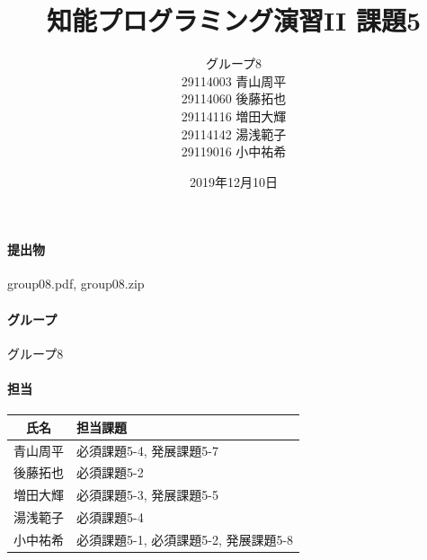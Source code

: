 \documentclass[uplatex,12pt]{jsarticle}
\title{知能プログラミング演習II 課題5}
\author{グループ8\\
  29114003 青山周平\\
  29114060 後藤拓也\\
  29114116 増田大輝\\
  29114142 湯浅範子\\
  29119016 小中祐希\\
}
\date{2019年12月10日}
\begin{document}
\maketitle

\paragraph{提出物} group08.pdf, group08.zip
\paragraph{グループ} グループ8

\paragraph{担当}
\begin{tabular}{|c|l|}
  \hline
  氏名&担当課題\\
  \hline\hline
  青山周平&必須課題5-4, 発展課題5-7\\
  \hline
  後藤拓也&必須課題5-2\\
  \hline
  増田大輝&必須課題5-3, 発展課題5-5\\
  \hline
  湯浅範子&必須課題5-4\\
  \hline
  小中祐希&必須課題5-1, 必須課題5-2, 発展課題5-8\\
  \hline
\end{tabular}
\end{document}

